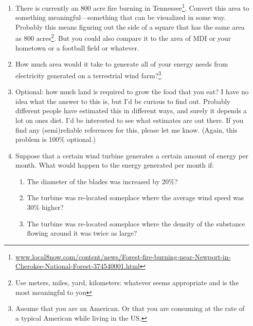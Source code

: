 \documentclass[11pt]{article}
\begin{document}
\begin{enumerate}



\item There is currently an $800$ acre fire burning in
  Tennessee\footnote{\url{www.local8now.com/content/news/Forest-fire-burning-near-Newport-in-Cherokee-National-Forest-374540001.html}}.
  Convert this area to something meaningful---something that can be
  visualized in some way.  Probably this means figuring out the side
  of a square that has the same area as $800$ acres\footnote{Use
    meters, miles, yard, kilometers: whatever seems appropriate and is
    the most meaningful to you}.  But you could also compare it to the
  area of MDI or your hometown or a football field or whatever.

\item How much area would it take to generate all of your energy needs
  from electricity generated on a terrestrial wind
  farm?\footnote{Assume that you are an American. Or that you are
    consuming at the rate of a typical American while living in the
    US.} 

\item Optional: how much land is required to grow the food that you
  eat?  I have no idea what the answer to this is, but I'd be curious
  to find out.  Probably different people have estimated this in
  different ways, and surely it depends a lot on ones diet.  I'd be
  interested to see what estimates are out there.  If you find any
  (semi)reliable references for this, please let me know.  (Again,
  this problem is 100\% optional.)

\item Suppose that a certain wind turbine generates a certain amount
  of energy per month.  What would happen to the energy generated per
  month if:
\begin{enumerate}
\setlength{\itemsep}{-1mm}
  \item The diameter of the blades was increased by 20\%?
  \item The turbine was re-located someplace where the average
    wind speed was 30\% higher?
  \item The turbine was re-located someplace where the density of the
    substance flowing around it was twice as large?
\end{enumerate}


\end{enumerate}
\end{document}
